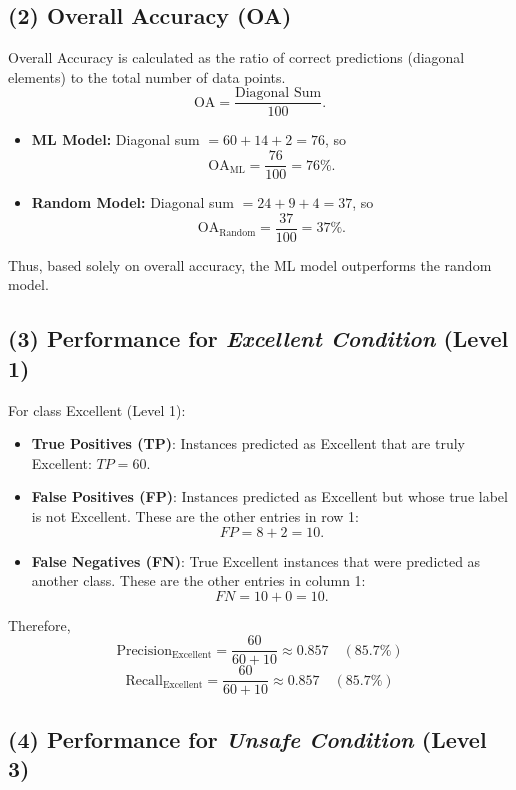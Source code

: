 \documentclass[12pt]{article}
\begin{document}
\subsection*{(2) Overall Accuracy (OA)}

Overall Accuracy is calculated as the ratio of correct predictions (diagonal elements) to the total number of data points.
\[
\text{OA} = \frac{\text{Diagonal Sum}}{100}.
\]
\begin{itemize}
    \item \textbf{ML Model:} Diagonal sum \(= 60 + 14 + 2 = 76\), so
    \[
    \text{OA}_{\text{ML}} = \frac{76}{100} = 76\%.
    \]
    \item \textbf{Random Model:} Diagonal sum \(= 24 + 9 + 4 = 37\), so
    \[
    \text{OA}_{\text{Random}} = \frac{37}{100} = 37\%.
    \]
\end{itemize}
Thus, based solely on overall accuracy, the ML model outperforms the random model.

\subsection*{(3) Performance for \textit{Excellent Condition} (Level 1)}

For class Excellent (Level 1):
\begin{itemize}
    \item \textbf{True Positives (TP)}: Instances predicted as Excellent that are truly Excellent: \(TP = 60\).
    \item \textbf{False Positives (FP)}: Instances predicted as Excellent but whose true label is not Excellent. These are the other entries in row 1:
    \[
    FP = 8+2 = 10.
    \]
    \item \textbf{False Negatives (FN)}: True Excellent instances that were predicted as another class. These are the other entries in column 1:
    \[
    FN = 10+0 = 10.
    \]
\end{itemize}
Therefore,
\[
\text{Precision}_{\text{Excellent}} = \frac{60}{60+10} \approx 0.857 \quad (85.7\%)
\]
\[
\text{Recall}_{\text{Excellent}} = \frac{60}{60+10} \approx 0.857 \quad (85.7\%)
\]

\subsection*{(4) Performance for \textit{Unsafe Condition} (Level 3)}
\end{document}
